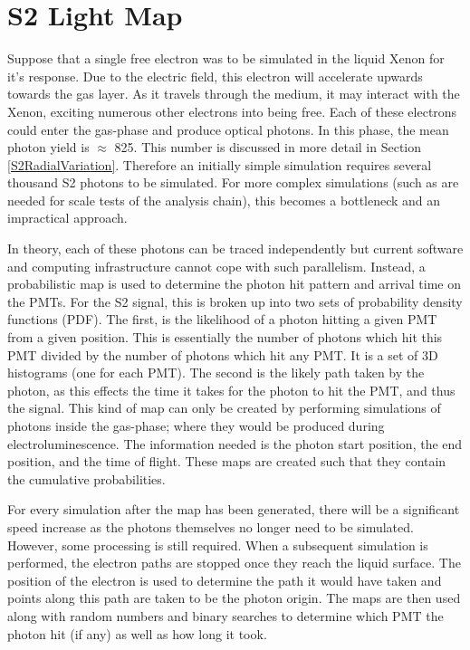 \section{S2 Light Map}
\label{s2lightmap}
\par
Suppose that a single free electron was to be simulated in the liquid Xenon for it's response.
Due to the electric field, this electron will accelerate upwards towards the gas layer.
As it travels through the medium, it may interact with the Xenon, exciting numerous other electrons into being free.
Each of these electrons could enter the gas-phase and produce optical photons.
In this phase, the mean photon yield is $\approx$ 825.
This number is discussed in more detail in Section \ref{S2RadialVariation}.
Therefore an initially simple simulation requires several thousand S2 photons to be simulated.
For more complex simulations (such as are needed for scale tests of the analysis chain), this becomes a bottleneck and an impractical approach.

\par
In theory, each of these photons can be traced independently but current software and computing infrastructure cannot cope with such parallelism. 
Instead, a probabilistic map is used to determine the photon hit pattern and arrival time on the PMTs.
For the S2 signal, this is broken up into two sets of probability density functions (PDF).
The first, is the likelihood of a photon hitting a given PMT from a given position.
This is essentially the number of photons which hit this PMT divided by the number of photons which hit any PMT.
It is a set of 3D histograms (one for each PMT).
The second is the likely path taken by the photon, as this effects the time it takes for the photon to hit the PMT, and thus the signal.
This kind of map can only be created by performing simulations of photons inside the gas-phase; where they would be produced during electroluminescence. 
The information needed is the photon start position, the end position, and the time of flight.
These maps are created such that they contain the cumulative probabilities.

\par
For every simulation after the map has been generated, there will be a significant speed increase as the photons themselves no longer need to be simulated.
However, some processing is still required.
When a subsequent simulation is performed, the electron paths are stopped once they reach the liquid surface.
The position of the electron is used to determine the path it would have taken and points along this path are taken to be the photon origin. %
The maps are then used along with random numbers and binary searches to determine which PMT the photon hit (if any) as well as how long it took.

